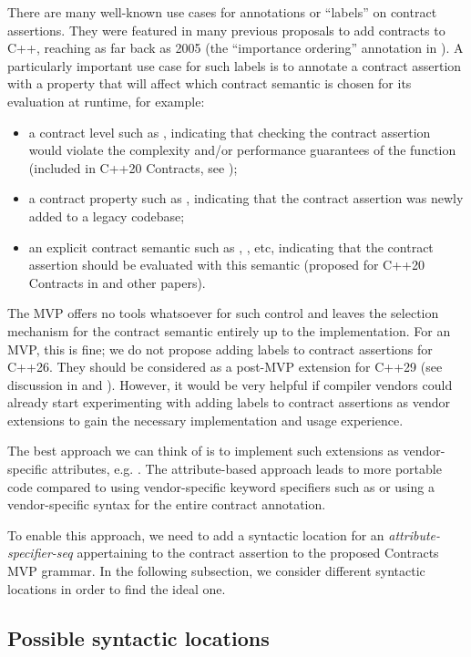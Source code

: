 There are many well-known use cases for annotations or ``labels'' on contract assertions. They were featured in many previous proposals to add contracts to C++, reaching as far back as 2005 (the ``importance ordering'' annotation in \cite{N1866}). A particularly important use case for such labels is to annotate a contract assertion with a property that will affect which contract semantic is chosen for its evaluation at runtime, for example:
\begin{itemize}
\item a contract level such as , indicating that checking the contract assertion would violate the complexity and/or performance guarantees of the function (included in C++20 Contracts, see \cite{P0542R5});
\item a contract property such as , indicating that the contract assertion was newly added to a legacy codebase;
\item an explicit contract semantic such as , , etc, indicating that the contract assertion should be evaluated with this semantic (proposed for C++20 Contracts in \cite{P1429R3} and other papers).
\end{itemize}
The MVP offers no tools whatsoever for such control and leaves the selection mechanism for the contract semantic entirely up to the implementation. For an MVP, this is fine; we do not propose adding labels to contract assertions for C++26. They should be considered as a post-MVP extension for C++29 (see discussion in \cite{P2755R0} and \cite{P2885R3}). However, it would be very helpful if compiler vendors could already start experimenting with adding labels to contract assertions as vendor extensions to gain the necessary implementation and usage experience.

The best approach we can think of is to implement such extensions as vendor-specific attributes, e.g. . The attribute-based approach leads to more portable code compared to using vendor-specific keyword specifiers such as  or using a vendor-specific syntax for the entire contract annotation.

To enable this approach, we need to add a syntactic location for an \emph{attribute-specifier-seq} appertaining to the contract assertion to the proposed Contracts MVP grammar. In the following subsection, we consider different syntactic locations in order to find the ideal one.

\subsection{Possible syntactic locations}


